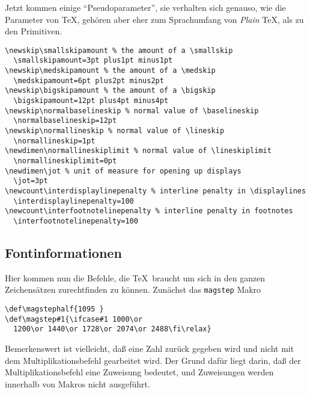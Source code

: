 \begin{appendix}
Jetzt kommen einige ``Pseudoparameter'', sie verhalten sich genauso,
wie die Parameter von \TeX, geh\"oren aber eher zum Sprachumfang von
{\em Plain} \TeX, als zu den Primitiven.
\begin{verbatim}
\newskip\smallskipamount % the amount of a \smallskip
  \smallskipamount=3pt plus1pt minus1pt
\newskip\medskipamount % the amount of a \medskip
  \medskipamount=6pt plus2pt minus2pt
\newskip\bigskipamount % the amount of a \bigskip
  \bigskipamount=12pt plus4pt minus4pt
\newskip\normalbaselineskip % normal value of \baselineskip
  \normalbaselineskip=12pt
\newskip\normallineskip % normal value of \lineskip
  \normallineskip=1pt
\newdimen\normallineskiplimit % normal value of \lineskiplimit
  \normallineskiplimit=0pt
\newdimen\jot % unit of measure for opening up displays
  \jot=3pt
\newcount\interdisplaylinepenalty % interline penalty in \displaylines
  \interdisplaylinepenalty=100
\newcount\interfootnotelinepenalty % interline penalty in footnotes
  \interfootnotelinepenalty=100
\end{verbatim}
\subsection{Fontinformationen}
Hier kommen nun die Befehle, die \TeX\ braucht um sich in den ganzen
Zeichens\"atzen zurechtfinden zu k\"onnen. Zun\"achst das {\tt magstep}
Makro
\begin{verbatim}
\def\magstephalf{1095 }
\def\magstep#1{\ifcase#1 1000\or
  1200\or 1440\or 1728\or 2074\or 2488\fi\relax}
\end{verbatim}
Bemerkenswert ist vielleicht, da\ss{} eine Zahl zur\"uck gegeben wird und
nicht mit dem Multiplikationsbefehl gearbeitet wird. Der Grund daf\"ur
liegt darin, da\ss{} der Multiplikationsbefehl eine Zuweisung bedeutet,
und Zuweisungen werden innerhalb von Makros nicht ausgef\"uhrt.


\end{appendix}
